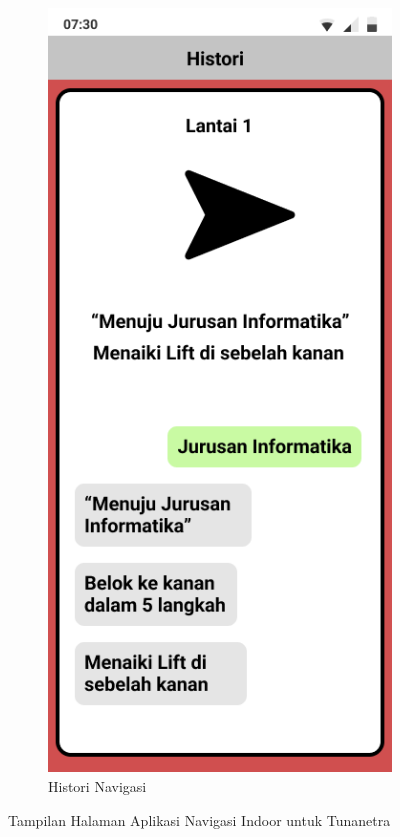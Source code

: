 \begin{enumerate}
\begin{figure} [H]
\begin{subfigure}{.5\textwidth}
  		\includegraphics[width=.5\linewidth]{gambar/bab3/4}  
  		\caption{Histori Navigasi}
	\end{subfigure}
		\vspace{0.5cm}
		\caption{Tampilan Halaman Aplikasi Navigasi Indoor untuk Tunanetra}
	\label{aplikasimappingbagian1}
	\end{figure}

\end{enumerate}


